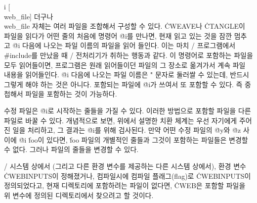 \@{i} [\\{web\_file}] 
더구나 \\{web\_file} 자체는 여러 파일을 조합해서 구성할 수 있다.
\.{CWEAVE}나 \.{CTANGLE}이 파일을 읽다가 어떤 줄의 처음에 명령어
\.{@i}를 만나면, 현재 읽고 있는 것을 잠깐 멈추고 \.{@i} 다음에 나오는
파일 이름의 파일을 읽어 들인다. 이는 마치 \CEE/ 프로그램에서
\.{\#include}를 만났을 때 \CEE/ 전처리기가 취하는 행동과 같다. 이
명령어로 포함하는 파일을 모두 읽어들이면, 프로그램은 원래 읽어들이던
파일의 그 장소로 옮겨가서 계속 파일 내용을 읽어들인다. \.{@i} 다음에
나오는 파일 이름은 \." 문자로 둘러쌀 수 있는데, 반드시 그렇게 해야 하는
것은 아니다. 포함되는 파일에 \.{@i}가 쓰여서 또 포함할 수 있다. 즉
중첩해서 파일을 포함하는 것이 가능하다.

\more
수정 파일은 \.{@i}로 시작하는 줄들을 가질 수 있다. 이러한 방법으로
포함할 파일을 다른 파일로 바꿀 수 있다. 개념적으로 보면, 위에서 설명한
치환 체계는 우선 자기에게 주어진 일을 처리하고, 그 결과는 \.{@i}를
위해 검사된다. 만약 어떤 수정 파일의 \.{@y}와 \.{@z}
사이에 \.{@i} \.{foo}이 있다면, \.{foo} 파일의 개별적인 줄들과 그것이
포함하는 파일들은 변경할 수 없다. 그러나 파일의 줄들을 변경할 수 있다. 

\more \UNIX/ 시스템 상에서 (그리고 다른 환경 변수를 제공하는 다른
시스템 상에서), 환경 변수 \.{CWEBINPUTS}이 정해졌거나, 컴파일시에
컴파일 플래그(flag)로 \.{CWEBINPUTS}이 정의되었다고, 현재 디렉토리에
포함하려는 파일이 없다면, \.{CWEB}은 포함할
파일을 위 변수에 정의된 디렉토리에서 찾으려고 할 것이다.

